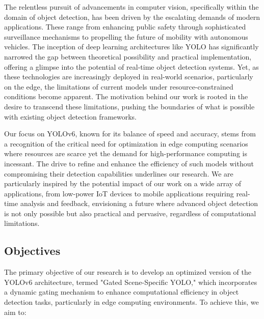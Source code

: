 The relentless pursuit of advancements in computer vision, specifically within the domain of object detection, has been driven by the escalating demands of modern applications. These range from enhancing public safety through sophisticated surveillance mechanisms to propelling the future of mobility with autonomous vehicles. The inception of deep learning architectures like YOLO has significantly narrowed the gap between theoretical possibility and practical implementation, offering a glimpse into the potential of real-time object detection systems. Yet, as these technologies are increasingly deployed in real-world scenarios, particularly on the edge, the limitations of current models under resource-constrained conditions become apparent. The motivation behind our work is rooted in the desire to transcend these limitations, pushing the boundaries of what is possible with existing object detection frameworks.

Our focus on YOLOv6, known for its balance of speed and accuracy, stems from a recognition of the critical need for optimization in edge computing scenarios where resources are scarce yet the demand for high-performance computing is incessant. The drive to refine and enhance the efficiency of such models without compromising their detection capabilities underlines our research. We are particularly inspired by the potential impact of our work on a wide array of applications, from low-power IoT devices to mobile applications requiring real-time analysis and feedback, envisioning a future where advanced object detection is not only possible but also practical and pervasive, regardless of computational limitations.

\subsection{Objectives}

The primary objective of our research is to develop an optimized version of the YOLOv6 architecture, termed "Gated Scene-Specific YOLO," which incorporates a dynamic gating mechanism to enhance computational efficiency in object detection tasks, particularly in edge computing environments. To achieve this, we aim to:


